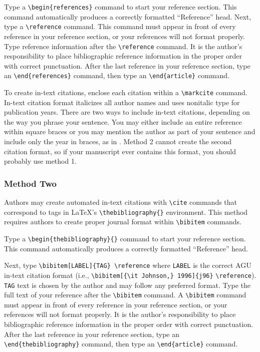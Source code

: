 \begin{article}
Type a \verb"\begin{references}" command
to start your reference section.  This command
automatically produces a correctly formatted 
``Reference'' head.  Next, type a \verb"\reference" 
command.  This command must appear in front of 
every reference in your reference section, or 
your references will not format properly.
Type reference information after the 
\verb"\reference" command.  It is the author's
responsibility to place bibliographic reference
information in the proper order with correct 
punctuation.  After the last reference in your
reference section, type an \verb"\end{references}"
command, then type an \verb"\end{article}" command.

To create in-text citations, enclose each citation
within a \verb"\markcite" command.  In-text
citation format italicizes all author names
and uses nonitalic type for publication years.
There are two ways to include in-text citations,
depending on the way you phrase your sentence.
You may either include an entire reference within
square braces \markcite{[{\it Merritt et al.,} 
1996]} or you may mention the author as part of 
your sentence and include only the year in braces, 
as in .  Method 2 cannot 
create the second citation format, so if your 
manuscript ever contains this format, you should 
probably use method 1.

\subsubsection{Method Two}
Authors may create automated in-text citations 
with \verb"\cite" commands that correspond to tags 
in \LaTeX's \verb"\thebibliography{}" environment.
This method requires authors to create proper 
journal format within \verb"\bibitem" commands.

Type a \verb"\begin{thebibliography}{}" command to start
your reference section.  This command automatically 
produces a correctly formatted ``Reference'' head.

Next, type \verb"\bibitem[LABEL]{TAG} \reference"
where {\tt LABEL} is the correct AGU in-text
citation format (i.e.,
\verb"\bibitem[{\it Johnson,} 1996]{j96}" \linebreak
\verb"\reference").  {\tt TAG} text is chosen by the 
author and may follow any preferred format.  Type 
the full text of your reference after the 
\verb"\bibitem" command.  A \verb"\bibitem" 
command must appear in front of every reference 
in your reference section, or your references will 
not format properly.  It is the author's responsibility
to place bibliographic reference information in the 
proper order with correct punctuation.  After 
the last reference in your reference section, 
type an \verb"\end{thebibliography}" command, 
then type an \verb"\end{article}" command.


\end{article}
